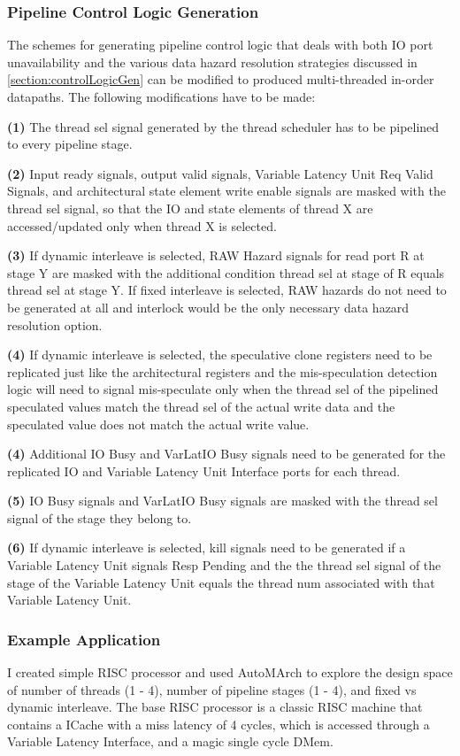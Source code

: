 \subsubsection{Pipeline Control Logic Generation}
The schemes for generating pipeline control logic that deals with both IO port unavailability and the various data hazard resolution strategies discussed in \ref{section:controlLogicGen} can be modified to produced multi-threaded in-order datapaths. The following modifications have to be made:

{\bf (1)} The thread sel signal generated by the thread scheduler has to be pipelined to every pipeline stage.

{\bf (2)} Input ready signals, output valid signals, Variable Latency Unit Req Valid Signals, and architectural state element write enable signals are masked with the thread sel signal, so that the IO and state elements of thread X are accessed/updated only when thread X is selected.

{\bf (3)} If dynamic interleave is selected, RAW Hazard signals for read port R at stage Y are masked with the additional condition thread sel at stage of R equals thread sel at stage Y. If fixed interleave is selected, RAW hazards do not need to be generated at all and interlock would be the only necessary data hazard resolution option.

{\bf (4)} If dynamic interleave is selected, the speculative clone registers need to be replicated just like the architectural registers and the mis-speculation detection logic will need to signal mis-speculate only when the thread sel of the pipelined speculated values match the thread sel of the actual write data and the speculated value does not match the actual write value.

{\bf (4)} Additional IO Busy and VarLatIO Busy signals need to be generated for the replicated IO and Variable Latency Unit Interface ports for each thread.

{\bf (5)} IO Busy signals and VarLatIO Busy signals are masked with the thread sel signal of the stage they belong to.

{\bf (6)} If dynamic interleave is selected, kill signals need to be generated if a Variable Latency Unit signals Resp Pending and the the thread sel signal of the stage of the Variable Latency Unit equals the thread num associated with that Variable Latency Unit.

\subsubsection{Example Application}
I created simple RISC processor and used AutoMArch to explore the design space of number of threads (1 - 4), number of pipeline stages (1 - 4), and fixed vs dynamic interleave. The base RISC processor is a classic RISC machine that contains a ICache with a miss latency of 4 cycles, which is accessed through a Variable Latency Interface, and a magic single cycle DMem. 


